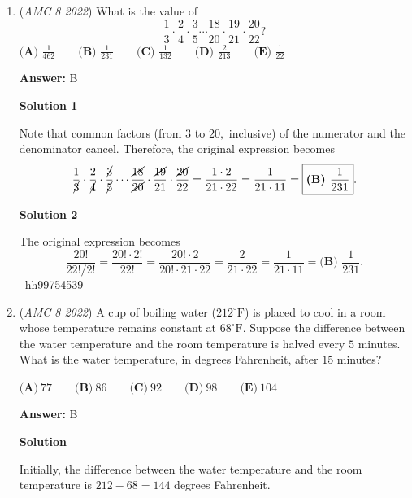 \begin{enumerate}
 
 \[\frac{x\ \text{min}}{4.2\ \text{mb}} \cdot \frac{56\ \text{kb}}{1\ \text{sec}} \cdot \frac{1\ \text{mb}}{8000\ \text{kb}} \cdot \frac{60\ \text{sec}}{1\ \text{min}} = 1.\]Solving yields $x=\boxed{\textbf{(B) } 10}$.

 -Benedict T (countmath1)

 


	\item (\textit{AMC 8 2022}) What is the value of 
 \[\frac{1}{3}\cdot\frac{2}{4}\cdot\frac{3}{5}\cdots\frac{18}{20}\cdot\frac{19}{21}\cdot\frac{20}{22}?\]
$\textbf{(A) } \frac{1}{462} \qquad \textbf{(B) } \frac{1}{231} \qquad \textbf{(C) } \frac{1}{132} \qquad \textbf{(D) } \frac{2}{213} \qquad \textbf{(E) } \frac{1}{22}$

 \textbf{Answer: }B



\textbf{Solution 1}

Note that common factors (from $3$ to $20,$ inclusive) of the numerator and the denominator cancel. Therefore, the original expression becomes 
 \[\frac{1}{\cancel{3}}\cdot\frac{2}{\cancel{4}}\cdot\frac{\cancel{3}}{\cancel{5}}\cdots\frac{\cancel{18}}{\cancel{20}}\cdot\frac{\cancel{19}}{21}\cdot\frac{\cancel{20}}{22}=\frac{1\cdot2}{21\cdot22}=\frac{1}{21\cdot11}=\boxed{\textbf{(B) } \frac{1}{231}}.\]




\textbf{Solution 2}

The original expression becomes 
 \[\frac{20!}{22!/2!} = \frac{20! \cdot 2!}{22!} = \frac{20! \cdot 2}{20! \cdot 21 \cdot 22} = \frac{2}{21 \cdot 22} = \frac{1}{21 \cdot 11} = \boxed{\textbf{(B) } \frac{1}{231}}.\]~hh99754539

 


	\item (\textit{AMC 8 2022}) A cup of boiling water ($212^{\circ}\text{F}$) is placed to cool in a room whose temperature remains constant at $68^{\circ}\text{F}$. Suppose the difference between the water temperature and the room temperature is halved every $5$ minutes. What is the water temperature, in degrees Fahrenheit, after $15$ minutes?


 $\textbf{(A)} ~77\qquad\textbf{(B)} ~86\qquad\textbf{(C)} ~92\qquad\textbf{(D)} ~98\qquad\textbf{(E)} ~104$

 \textbf{Answer: }B



\textbf{Solution}

Initially, the difference between the water temperature and the room temperature is $212-68=144$ degrees Fahrenheit.


\end{enumerate}

